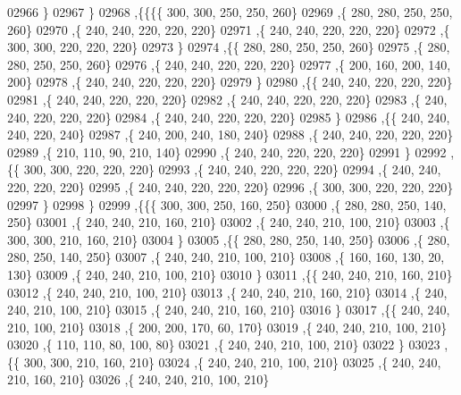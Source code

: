 \begin{DoxyCode}
02966    \}
02967   \}
02968  ,\{\{\{\{   300,   300,   250,   250,   260\}
02969     ,\{   280,   280,   250,   250,   260\}
02970     ,\{   240,   240,   220,   220,   220\}
02971     ,\{   240,   240,   220,   220,   220\}
02972     ,\{   300,   300,   220,   220,   220\}
02973     \}
02974    ,\{\{   280,   280,   250,   250,   260\}
02975     ,\{   280,   280,   250,   250,   260\}
02976     ,\{   240,   240,   220,   220,   220\}
02977     ,\{   200,   160,   200,   140,   200\}
02978     ,\{   240,   240,   220,   220,   220\}
02979     \}
02980    ,\{\{   240,   240,   220,   220,   220\}
02981     ,\{   240,   240,   220,   220,   220\}
02982     ,\{   240,   240,   220,   220,   220\}
02983     ,\{   240,   240,   220,   220,   220\}
02984     ,\{   240,   240,   220,   220,   220\}
02985     \}
02986    ,\{\{   240,   240,   240,   220,   240\}
02987     ,\{   240,   200,   240,   180,   240\}
02988     ,\{   240,   240,   220,   220,   220\}
02989     ,\{   210,   110,    90,   210,   140\}
02990     ,\{   240,   240,   220,   220,   220\}
02991     \}
02992    ,\{\{   300,   300,   220,   220,   220\}
02993     ,\{   240,   240,   220,   220,   220\}
02994     ,\{   240,   240,   220,   220,   220\}
02995     ,\{   240,   240,   220,   220,   220\}
02996     ,\{   300,   300,   220,   220,   220\}
02997     \}
02998    \}
02999   ,\{\{\{   300,   300,   250,   160,   250\}
03000     ,\{   280,   280,   250,   140,   250\}
03001     ,\{   240,   240,   210,   160,   210\}
03002     ,\{   240,   240,   210,   100,   210\}
03003     ,\{   300,   300,   210,   160,   210\}
03004     \}
03005    ,\{\{   280,   280,   250,   140,   250\}
03006     ,\{   280,   280,   250,   140,   250\}
03007     ,\{   240,   240,   210,   100,   210\}
03008     ,\{   160,   160,   130,    20,   130\}
03009     ,\{   240,   240,   210,   100,   210\}
03010     \}
03011    ,\{\{   240,   240,   210,   160,   210\}
03012     ,\{   240,   240,   210,   100,   210\}
03013     ,\{   240,   240,   210,   160,   210\}
03014     ,\{   240,   240,   210,   100,   210\}
03015     ,\{   240,   240,   210,   160,   210\}
03016     \}
03017    ,\{\{   240,   240,   210,   100,   210\}
03018     ,\{   200,   200,   170,    60,   170\}
03019     ,\{   240,   240,   210,   100,   210\}
03020     ,\{   110,   110,    80,   100,    80\}
03021     ,\{   240,   240,   210,   100,   210\}
03022     \}
03023    ,\{\{   300,   300,   210,   160,   210\}
03024     ,\{   240,   240,   210,   100,   210\}
03025     ,\{   240,   240,   210,   160,   210\}
03026     ,\{   240,   240,   210,   100,   210\}

\end{DoxyCode}
